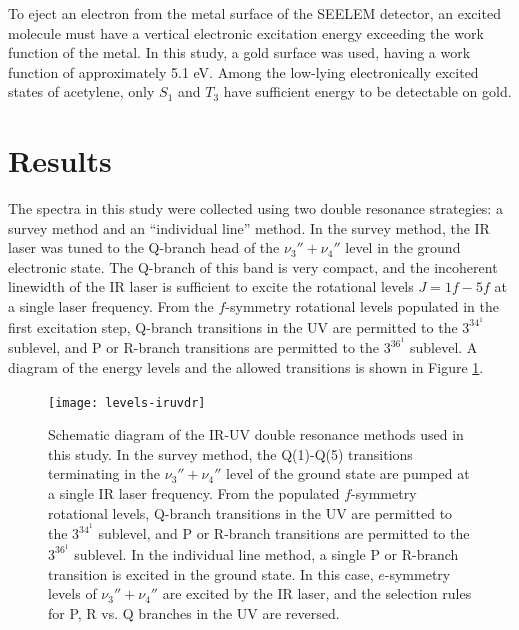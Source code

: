\documentclass[12pt]{mitthesis}
\begin{document}
To eject an electron from the metal surface of the SEELEM detector, an
excited molecule must have a vertical electronic excitation energy
exceeding the work function of the metal.  In this study, a gold
surface was used, having a work function of approximately 5.1 eV.
Among the low-lying electronically excited states of acetylene, only
$S_1$ and $T_3$ have sufficient energy to be detectable on gold.





















\section{Results}

The spectra in this study were collected using two double resonance
strategies: a survey method and an ``individual line'' method.  In the
survey method, the IR laser was tuned to the Q-branch head of the
$\nu_3''+\nu_4''$ level in the ground electronic state.  The Q-branch of
this band is very compact, and the incoherent linewidth of the IR
laser is sufficient to excite the rotational levels $J=1f-5f$ at a
single laser frequency.  From the $f$-symmetry rotational levels
populated in the first excitation step, Q-branch transitions in the UV
are permitted to the $3^34^1$  sublevel, and P or R-branch
transitions are permitted to the $3^36^1$  sublevel.  A diagram
of the energy levels and the allowed transitions is shown in Figure
\ref{fig:levels-iruvdr}.

\begin{figure}
  \centering
  
  \texttt{[image: levels-iruvdr]}

  \caption{Schematic diagram of the IR-UV double resonance methods
    used in this study.  In the survey method, the Q(1)-Q(5)
    transitions terminating in the $\nu_3''+\nu_4''$ level of the
    ground state are pumped at a single IR laser frequency.  From the
    populated $f$-symmetry rotational levels, Q-branch transitions in
    the UV are permitted to the $3^34^1$  sublevel, and P or
    R-branch transitions are permitted to the $3^36^1$ 
    sublevel.  In the individual line method, a single P or R-branch
    transition is excited in the ground state.  In this case,
    $e$-symmetry levels of $\nu_3''+\nu_4''$ are excited by the IR
    laser, and the selection rules for P, R vs. Q branches in the UV
    are reversed.}
  \label{fig:levels-iruvdr}
\end{figure}
\end{document}
